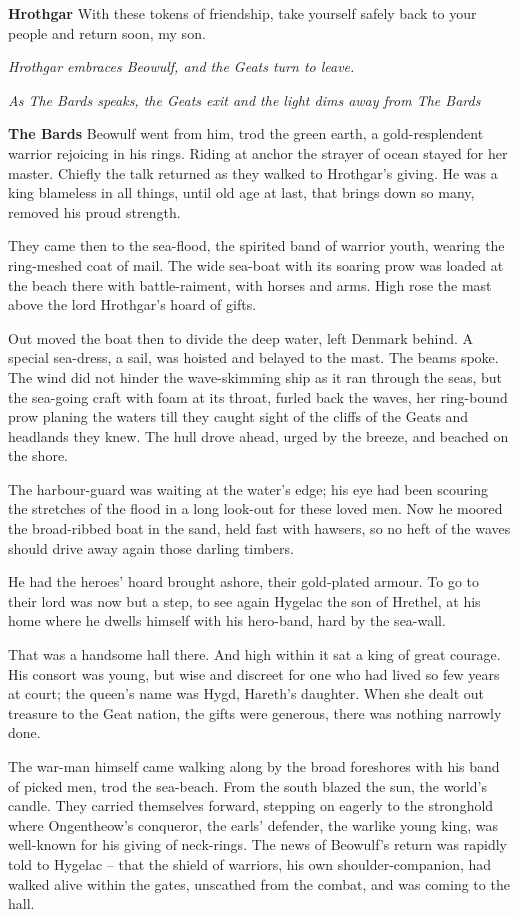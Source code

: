 \documentclass[a4paper]{article}
\begin{document}
{\textbf{Hrothgar} With these tokens of friendship,
take yourself safely back to your people
and return soon, my son.

\centerline{\textit{Hrothgar embraces Beowulf, and the Geats turn to leave.}}
\centerline{\textit{As The Bards speaks, the Geats exit and the light dims away from The Bards}}

\textbf{The Bards}  Beowulf went from him,
trod the green earth, a gold-resplendent warrior
rejoicing in his rings. Riding at anchor
the strayer of ocean stayed for her master.
Chiefly the talk returned as they walked
to Hrothgar’s giving. He was a king
blameless in all things, until old age at last,
that brings down so many, removed his proud strength.

They came then to the sea-flood, the spirited band
of warrior youth, wearing the ring-meshed
coat of mail.
The wide sea-boat with its soaring prow
was loaded at the beach there with battle-raiment,
with horses and arms. High rose the mast
above the lord Hrothgar’s hoard of gifts.

Out moved the boat then
to divide the deep water, left Denmark behind.
A special sea-dress, a sail, was hoisted
and belayed to the mast. The beams spoke.
The wind did not hinder the wave-skimming ship
as it ran through the seas, but the sea-going craft
with foam at its throat, furled back the waves,
her ring-bound prow planing the waters
till they caught sight of the cliffs of the Geats
and headlands they knew. The hull drove ahead,
urged by the breeze, and beached on the shore.

The harbour-guard was waiting at the water’s edge;
his eye had been scouring the stretches of the flood
in a long look-out for these loved men.
Now he moored the broad-ribbed boat in the sand,
held fast with hawsers, so no heft of the waves
should drive away again those darling timbers.

He had the heroes’ hoard brought ashore,
their gold-plated armour. To go to their lord
was now but a step, to see again Hygelac
the son of Hrethel, at his home where he dwells
himself with his hero-band, hard by the sea-wall.

That was a handsome hall there. And high within it sat
a king of great courage. His consort was young,
but wise and discreet for one who had lived
so few years at court; the queen’s name was Hygd,
Hareth’s daughter. When she dealt out treasure
to the Geat nation, the gifts were generous,
there was nothing narrowly done.

The war-man himself came walking along
by the broad foreshores with his band of picked men,
trod the sea-beach. From the south blazed
the sun, the world’s candle. They carried themselves forward,
stepping on eagerly to the stronghold where
Ongentheow’s conqueror, the earls’ defender,
the warlike young king, was well-known for his
giving of neck-rings. The news of Beowulf’s
return was rapidly told to Hygelac
– that the shield of warriors, his own shoulder-companion,
had walked alive within the gates,
unscathed from the combat, and was coming to the hall.

}
\end{document}
